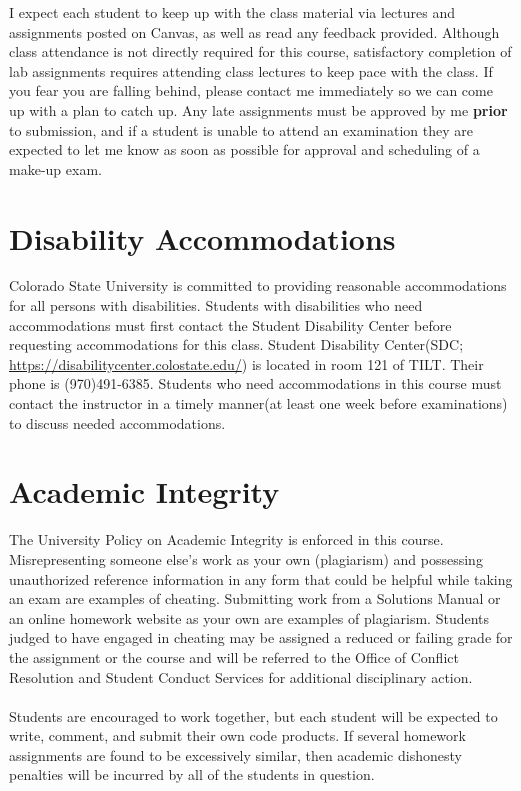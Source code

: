 \documentclass[11pt]{article}
\begin{document}
\noindent I expect each student to keep up with the class material via lectures and assignments posted on Canvas, as well as read any feedback provided. Although class attendance is not directly required for this course, satisfactory completion of lab assignments requires attending class lectures to keep pace with the class. If you fear you are falling behind, please contact me immediately so we can come up with a plan to catch up. Any late assignments must be approved by me \textbf{prior} to submission, and if a student is unable to attend an examination they are expected to let me know as soon as possible for approval and scheduling of a make-up exam.

\section*{Disability Accommodations}
Colorado State University is committed to providing reasonable accommodations for all persons with disabilities. Students with disabilities who need accommodations must first contact the Student Disability Center before requesting accommodations for this class. Student Disability Center(SDC; \url{https://disabilitycenter.colostate.edu/}) is located in room 121 of TILT. Their phone is (970)491-6385. Students who need accommodations in this course must contact the instructor in a timely manner(at least one week before examinations) to discuss needed accommodations. 

\section*{Academic Integrity}
The University Policy on Academic Integrity is enforced in this course.
Misrepresenting someone else’s work as your own (plagiarism) and possessing unauthorized reference
information in any form that could be helpful while taking an exam are examples of cheating. Submitting
work from a Solutions Manual or an online homework website as your own are examples of plagiarism.
Students judged to have engaged in cheating may be assigned a reduced or failing grade for the
assignment or the course and will be referred to the Office of Conflict Resolution and Student Conduct
Services for additional disciplinary action. \\
\\
Students are encouraged to work together, but each student will be expected to write, comment, and submit their own code products. If several homework assignments are found to be excessively similar, then academic dishonesty penalties will be incurred by all of the students in question.
\end{document}
